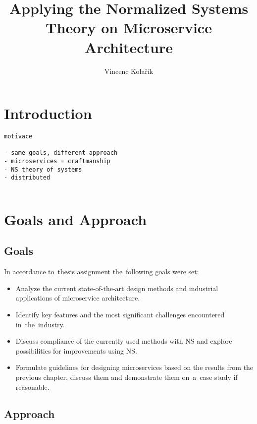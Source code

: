 \documentclass[thesis=M,english,hidelinks]{FITthesis}[2012/10/20]
\title{Applying the Normalized Systems Theory on Microservice Architecture}
\author{Vincenc Kolařík} %
\begin{document}
\listoftodos 

%
%
\chapter{Introduction}
\begin{verbatim}
motivace

- same goals, different approach
- microservices = craftmanship
- NS theory of systems
- distributed 
    
\end{verbatim}


%
%

\chapter{Goals and Approach}
\section{Goals}
In accordance to~thesis assignment the~following goals were set:
\begin{itemize}
	\item Analyze the current state-of-the-art design methods and industrial applications of microservice architecture.
	\item Identify key features and the most significant challenges encountered in~the~industry.
	\item Discuss compliance of the currently used methods with \acrlong{NS} and explore possibilities for improvements using \acrshort{NS}. 
	\item Formulate guidelines for designing microservices based on the results from the previous chapter, discuss them and demonstrate them on~a~case study if reasonable.
\end{itemize}

\section{Approach}
\end{document}
